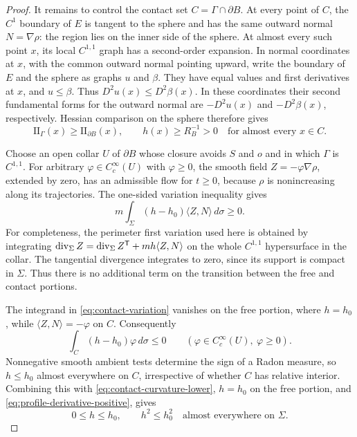 \begin{proof}
It remains to control the contact set $C=\Gamma\cap\partial B$.
At every point of $C$, the $C^1$ boundary of $E$ is tangent to the
sphere and has the same outward normal $N=\nabla\rho$: the region
lies on the inner side of the sphere.  At almost every such point
$x$, its local $C^{1,1}$ graph has a second-order expansion.  In
normal coordinates at $x$, with the common outward normal pointing
upward, write the boundary of $E$ and the sphere as graphs $u$ and
$\beta$.  They have equal values and first derivatives at $x$, and
$u\le\beta$.  Thus $D^2u(x)\le D^2\beta(x)$.  In these coordinates their
second fundamental forms for the outward normal are $-D^2u(x)$ and
$-D^2\beta(x)$, respectively. Hessian comparison on the sphere therefore gives
\begin{equation}
 \label{eq:contact-curvature-lower}
 \mathrm{II}_{\Gamma}(x)\ge\mathrm{II}_{\partial B}(x),
 \qquad h(x)\ge R_B^{-1}>0
 \quad\text{for almost every }x\in C.
\end{equation}

Choose an open collar $U$ of $\partial B$ whose closure avoids $S$
and $o$ and in which $\Gamma$ is $C^{1,1}$.  For arbitrary
$\varphi\in C_c^\infty(U)$ with $\varphi\ge0$, the smooth field
$Z=-\varphi\nabla\rho$, extended by zero, has an admissible flow for
$t\ge0$, because $\rho$ is nonincreasing along its trajectories.
The one-sided variation inequality gives
\begin{equation}
 \label{eq:contact-variation}
 m\int_\Sigma(h-h_0)\langle Z,N\rangle\,d\sigma\ge0.
\end{equation}
For completeness, the perimeter first variation used here is obtained
by integrating
$\operatorname{div}_\Sigma Z=\operatorname{div}_\Sigma Z^{\mathsf T}
 +mh\langle Z,N\rangle$ on the whole $C^{1,1}$ hypersurface in
the collar.  The tangential divergence integrates to zero, since
its support is compact in $\Sigma$.  Thus there is no additional
term on the transition between the free and contact portions.

The integrand in \eqref{eq:contact-variation} vanishes on the free
portion, where $h=h_0$, while $\langle Z,N\rangle=-\varphi$ on $C$.
Consequently
\[
 \int_C(h-h_0)\varphi\,d\sigma\le0
 \qquad (\varphi\in C_c^\infty(U),\ \varphi\ge0).
\]
Nonnegative smooth ambient tests determine the sign of a Radon
measure, so $h\le h_0$ almost everywhere on $C$, irrespective of
whether $C$ has relative interior.  Combining this with
\eqref{eq:contact-curvature-lower}, $h=h_0$ on the free portion,
and \eqref{eq:profile-derivative-positive}, gives
\begin{equation}
 \label{eq:profile-curvature-bound}
 0\le h\le h_0,\qquad h^2\le h_0^2
 \quad\text{almost everywhere on }\Sigma.
\end{equation}
\end{proof}
